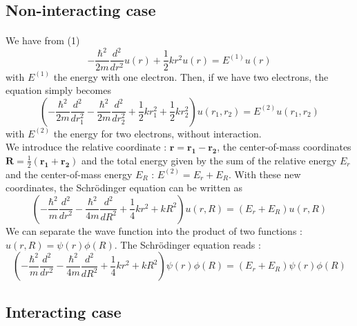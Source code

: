 \documentclass[a4paper, twoside, 11pt]{report}
\theoremstyle{theorem}
\theoremstyle{remark}
\theoremstyle{exemple}
\begin{document}
        \subsection{Non-interacting case}
    \paragraph{}We have from (1)  
        \begin{equation*}
            -\frac{\hbar^2}{2 m} \frac{d^2}{dr^2} u(r)  + \frac{1}{2} k r^2 u(r)  = E^{(1)} u(r)
        \end{equation*}
    with $E^{(1)}$ the energy with one electron. Then, if we have two electrons, the equation simply becomes 
        \begin{equation*}
            \left(-\frac{\hbar^2}{2 m} \frac{d^2}{dr_1^2} - \frac{\hbar^2}{2 m} \frac{d^2}{dr_2^2} + \frac{1}{2} k r_1^2 + \frac{1}{2} k r_2^2 \right)u(r_1,r_2)  = E^{(2)} u(r_1,r_2)
        \end{equation*}
    with $E^{(2)}$ the energy for two electrons, without interaction. \\
    We introduce the relative coordinate : $\mathbf{r} = \mathbf{r_1} - \mathbf{r_2}$, the center-of-mass coordinates $\mathbf{R} = \frac{1}{2}(\mathbf{r_1}+\mathbf{r_2})$ and the total energy given by the sum of the relative energy $E_r$ and the center-of-mass energy $E_R$ : $E^{(2)} = E_r + E_R$. With these new coordinates, the Schrödinger equation can be written as
        \begin{equation*}
            \left( -\frac{\hbar^2}{m}\frac{d^2}{dr^2} - \frac{\hbar^2}{4m}\frac{d^2}{dR^2} + \frac{1}{4}kr^2 + kR^2 \right) u(r,R) = (E_r + E_R)u(r,R)
        \end{equation*}
    We can separate the wave function into the product of two functions : $u(r,R)=\psi(r)\phi(R)$. The Schrödinger equation reads :
        \begin{equation}
            \left( -\frac{\hbar^2}{m}\frac{d^2}{dr^2} - \frac{\hbar^2}{4m}\frac{d^2}{dR^2} + \frac{1}{4}kr^2 + kR^2 \right) \psi(r)\phi(R) = (E_r + E_R) \psi(r)\phi(R)
            \tag{5}
        \end{equation}
    
    
        \subsection{Interacting case}
\end{document}
